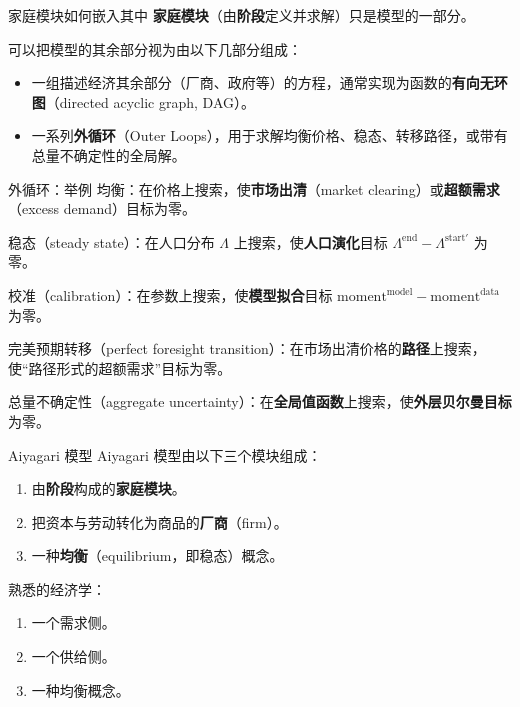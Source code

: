 \documentclass[10pt,aspectratio=169]{beamer}
\begin{document}
\begin{frame}{家庭模块如何嵌入其中}
  \textbf{家庭模块}（由\textbf{阶段}定义并求解）只是模型的一部分。

  可以把模型的其余部分视为由以下几部分组成：
  \begin{itemize}
    \item 一组描述经济其余部分（厂商、政府等）的方程，通常实现为函数的\textbf{有向无环图}（directed acyclic graph, DAG）。
    \item 一系列\textbf{外循环}（Outer Loops），用于求解均衡价格、稳态、转移路径，或带有总量不确定性的全局解。
  \end{itemize}
\end{frame}

\begin{frame}{外循环：举例}
  均衡：在价格上搜索，使\textbf{市场出清}（market clearing）或\textbf{超额需求}（excess demand）目标为零。

  稳态（steady state）：在人口分布 $\Lambda$ 上搜索，使\textbf{人口演化}目标 $\Lambda^\text{end} - \Lambda^{\text{start}'}$ 为零。

  校准（calibration）：在参数上搜索，使\textbf{模型拟合}目标 $\text{moment}^\text{model} - \text{moment}^\text{data}$ 为零。

  完美预期转移（perfect foresight transition）：在市场出清价格的\textbf{路径}上搜索，使``路径形式的超额需求''目标为零。

  总量不确定性（aggregate uncertainty）：在\textbf{全局值函数}上搜索，使\textbf{外层贝尔曼目标}为零。
\end{frame}

\begin{frame}{Aiyagari 模型}
  Aiyagari 模型由以下三个模块组成：
  \begin{enumerate}
    \item 由\textbf{阶段}构成的\textbf{家庭模块}。
    \item 把资本与劳动转化为商品的\textbf{厂商}（firm）。
    \item 一种\textbf{均衡}（equilibrium，即稳态）概念。
  \end{enumerate}

  熟悉的经济学：
  \begin{enumerate}
    \item 一个需求侧。
    \item 一个供给侧。
    \item 一种均衡概念。
  \end{enumerate}
\end{frame}
\end{document}
